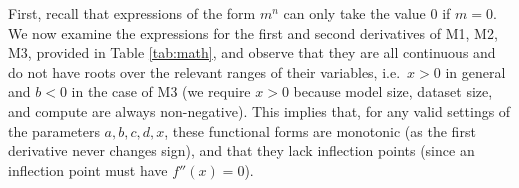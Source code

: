 \documentclass{article} %
\begin{document}


First, recall that expressions of the form $m^n$ can only take the value $0$ if $m=0$. 
We now examine the expressions for the first and second derivatives of M1, M2, M3, %
provided in Table \ref{tab:math}, and observe that they are all continuous and do not have roots over the relevant ranges of their variables, i.e.\ $x>0$ in general and $b<0$ in the case of M3 
(we require $x > 0$ because model size, dataset size, and compute are always non-negative).
This implies that, for any valid settings of the parameters $a,b,c,d,x$, these functional forms are monotonic (as the first derivative never changes sign), and that they lack inflection points (since an inflection point must have $f''(x)=0$).
\end{document}
